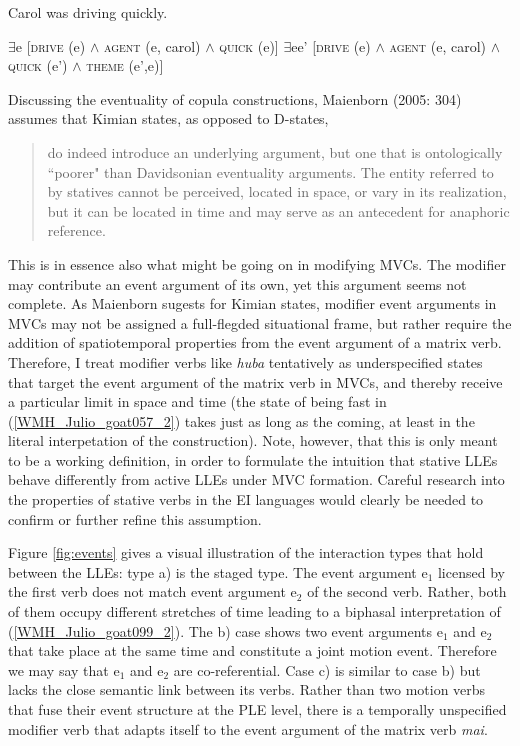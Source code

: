 \ea Carol was driving quickly.


\ea \label{carola} $\exists$e [\textsc{drive} (e) $\land$ \textsc{agent} (e, carol) $\land$ \textsc{quick} (e)]
\ex \label{carolb} $\exists$ee' [\textsc{drive} (e) $\land$ \textsc{agent} (e, carol) $\land$ \textsc{quick} (e') $\land$ \textsc{theme} (e',e)]
\z
\z

\xe

Discussing the eventuality of copula constructions, Maienborn (2005: 304) assumes that Kimian states, as opposed to D-states, 

\begin{quote}do indeed introduce an underlying argument, but one that is ontologically ``poorer" than Davidsonian eventuality arguments. The entity referred to by statives cannot be perceived, located in space, or vary in its realization, but it can be located in time and may serve as an antecedent for anaphoric reference.\end{quote}

This is in essence also what might be going on in modifying MVCs. The modifier may contribute an event argument of its own, yet this argument seems not complete. As Maienborn sugests for Kimian states, modifier event arguments in MVCs may not be assigned a full-flegded situational frame, but rather require the addition of spatiotemporal properties from the event argument of a matrix verb. Therefore, I treat modifier verbs like \textit{huba} tentatively as underspecified states that target the event argument of the matrix verb in MVCs, and thereby receive a particular limit in space and time (the state of being fast in (\ref{WMH_Julio_goat057_2}) takes just as long as the coming, at least in the literal interpetation of the construction). Note, however, that this is only meant to be a working definition, in order to formulate the intuition that stative LLEs behave differently from active LLEs under MVC formation. Careful research into the properties of stative verbs in the EI languages would clearly be needed to confirm or further refine this assumption.

Figure \ref{fig:events} gives a visual illustration of the interaction types that hold between the LLEs: type a) is the staged type. The event argument e$_1$ licensed by the first verb does not match event argument e$_2$ of the second verb. Rather, both of them occupy different stretches of time leading to a biphasal interpretation of (\ref{WMH_Julio_goat099_2}). The b) case shows two event arguments e$_1$ and e$_2$ that take place at the same time and constitute a joint motion event. Therefore we may say that e$_1$ and e$_2$ are co-referential. Case c) is similar to case b) but lacks the close semantic link between its verbs. Rather than two motion verbs that fuse their event structure at the PLE level, there is a temporally unspecified modifier verb that adapts itself to the event argument of the matrix verb \textit{mai}.

